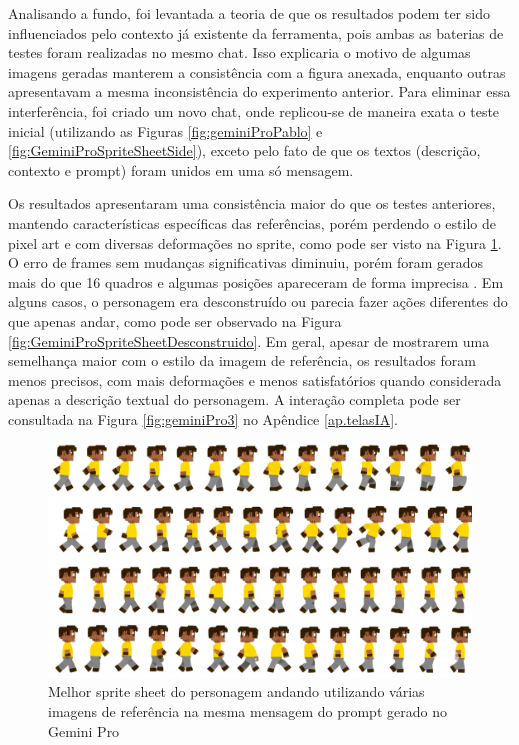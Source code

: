 Analisando a fundo, foi levantada a teoria de que os resultados podem ter sido influenciados pelo contexto já existente da ferramenta, pois ambas as baterias de testes foram realizadas no mesmo chat. Isso explicaria o motivo de algumas imagens geradas manterem a consistência com a figura anexada, enquanto outras apresentavam a mesma inconsistência do experimento anterior. Para eliminar essa interferência, foi criado um novo chat, onde replicou-se de maneira exata o teste inicial (utilizando as Figuras \ref{fig:geminiProPablo} e \ref{fig:GeminiProSpriteSheetSide}), exceto pelo fato de que os textos (descrição, contexto e prompt) foram unidos em uma só mensagem. 

Os resultados apresentaram uma consistência maior do que os testes anteriores, mantendo características específicas das referências, porém perdendo o estilo de pixel art e com diversas deformações no sprite, como pode ser visto na Figura \ref{fig:GeminiProSpriteSheetMelhor1}. O erro de frames sem mudanças significativas diminuiu, porém foram gerados mais do que 16 quadros e algumas posições apareceram de forma imprecisa . Em alguns casos, o personagem era desconstruído ou parecia fazer ações diferentes do que apenas andar, como pode ser observado na Figura \ref{fig:GeminiProSpriteSheetDesconstruido}. Em geral, apesar de mostrarem uma semelhança maior com o estilo da imagem de referência, os resultados foram menos precisos, com mais deformações e menos satisfatórios quando considerada apenas a descrição textual do personagem. A interação completa pode ser consultada na Figura \ref{fig:geminiPro3} no Apêndice \ref{ap.telasIA}.

\begin{figure}[htbp]
    \centering
    \caption{\small Melhor sprite sheet do personagem andando utilizando várias imagens de referência na mesma mensagem do prompt gerado no Gemini Pro}
    \label{fig:GeminiProSpriteSheetMelhor1}
    \includegraphics[width=0.8\linewidth]{figs/geminiPro/chat9/1res1.PNG}
\end{figure}

